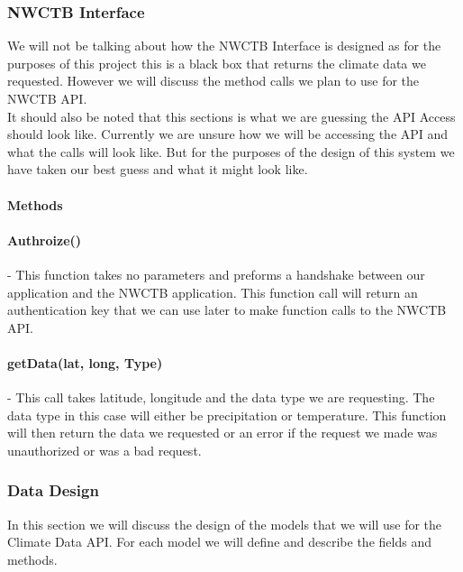 \documentclass[onecolumn, draftclsnofoot,10pt, compsoc]{article}
\begin{document}
				\subsubsection{NWCTB Interface}
					We will not be talking about how the NWCTB Interface is designed as for the purposes of this project this is a black box that returns the climate data we requested. However we will discuss the method calls we plan to use for the NWCTB API.\\

					It should also be noted that this sections is what we are guessing the API Access should look like. Currently we are unsure how we will be accessing the API and what the calls will look like. But for the purposes of the design of this system we have taken our best guess and what it might look like.\\

					\paragraph{\textbf{Methods}}


					\paragraph{Authroize()} - This function takes no parameters and preforms a handshake between our application and the NWCTB application. This function call will return an authentication key that we can use later to make function calls to the NWCTB API.\\
					\paragraph{getData(lat, long, Type)} - This call takes latitude, longitude and the data type we are requesting. The data type in this case will either be precipitation or temperature. This function will then return the data we requested or an error if the request we made was unauthorized or was a bad request.\\


			\subsubsection{Data Design}
			In this section we will discuss the design of the models that we will use for the Climate Data API. For each model we will define and describe the fields and methods.\\
\end{document}

